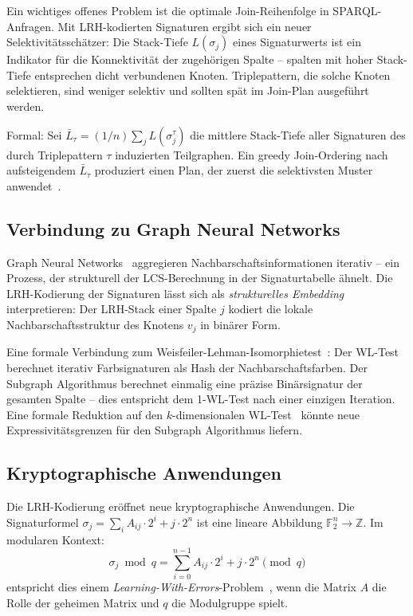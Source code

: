 ﻿\documentclass[a4paper,12pt]{article}
\theoremstyle{definition}
\begin{document}
Ein wichtiges offenes Problem ist die optimale Join-Reihenfolge in SPARQL-Anfragen.
Mit LRH-kodierten Signaturen ergibt sich ein neuer Selektivitätsschätzer: Die
Stack-Tiefe $L(\sigma_j)$ eines Signaturwerts ist ein Indikator für die Konnektivität
der zugehörigen Spalte -- spalten mit hoher Stack-Tiefe entsprechen dicht verbundenen
Knoten. Triplepattern, die solche Knoten selektieren, sind weniger selektiv und
sollten spät im Join-Plan ausgeführt werden.

Formal: Sei $\bar{L}_\tau = (1/n) \sum_j L(\sigma_j^\tau)$ die mittlere Stack-Tiefe
aller Signaturen des durch Triplepattern $\tau$ induzierten Teilgraphen. Ein greedy
Join-Ordering nach aufsteigendem $\bar{L}_\tau$ produziert einen Plan, der zuerst
die selektivsten Muster anwendet~\cite{stocker2008,neumann2009}.

\subsection{Verbindung zu Graph Neural Networks}

Graph Neural Networks~\cite{kipf2017,velickovic2018} aggregieren Nachbarschafts\-informationen
iterativ -- ein Prozess, der strukturell der LCS-Berechnung in der Signaturtabelle
ähnelt. Die LRH-Kodierung der Signaturen lässt sich als \emph{strukturelles Embedding}
interpretieren: Der LRH-Stack einer Spalte $j$ kodiert die lokale Nachbarschaftsstruktur
des Knotens $v_j$ in binärer Form.

Eine formale Verbindung zum Weisfeiler-Lehman-Isomorphietest~\cite{weisfeiler1968}:
Der WL-Test berechnet iterativ Farbsignaturen als Hash der Nachbarschaftsfarben.
Der Subgraph Algorithmus berechnet einmalig eine präzise Binärsignatur der gesamten
Spalte -- dies entspricht dem 1-WL-Test nach einer einzigen Iteration.
Eine formale Reduktion auf den $k$-dimensionalen WL-Test~\cite{azizian2020} könnte
neue Expressivitätsgrenzen für den Subgraph Algorithmus liefern.

\subsection{Kryptographische Anwendungen}

Die LRH-Kodierung eröffnet neue kryptographische Anwendungen. Die Signaturformel
$\sigma_j = \sum_{i} A_{ij} \cdot 2^i + j \cdot 2^n$ ist eine lineare Abbildung
$\mathbb{F}_2^n \to \mathbb{Z}$. Im modularen Kontext:
\[
  \sigma_j \bmod q = \sum_{i=0}^{n-1} A_{ij} \cdot 2^i + j \cdot 2^n \pmod{q}
\]
entspricht dies einem \emph{Learning-With-Errors}-Problem~\cite{regev2009}, wenn
die Matrix $A$ die Rolle der geheimen Matrix und $q$ die Modulgruppe spielt.
\end{document}
